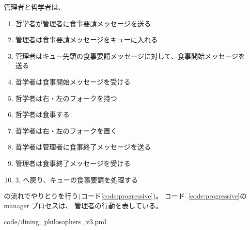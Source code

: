 管理者と哲学者は、
\begin{enumerate}
	\item 哲学者が管理者に食事要請メッセージを送る
	\item 管理者は食事要請メッセージをキューに入れる
	\item 管理者はキュー先頭の食事要請メッセージに対して、食事開始メッセージを送る
	\item 哲学者は食事開始メッセージを受ける
	\item 哲学者は右・左のフォークを持つ
	\item 哲学者は食事する
	\item 哲学者は右・左のフォークを置く
	\item 哲学者は管理者に食事終了メッセージを送る
	\item 管理者は食事終了メッセージを受ける
	\item 3. へ戻り、キューの食事要請を処理する
\end{enumerate}
の流れでやりとりを行う(コード\ref{code:progressive})。
コード~\ref{code:progressive}の manager プロセスは、
管理者の行動を表している。


	{code/dining_philosophers_v3.pml}
